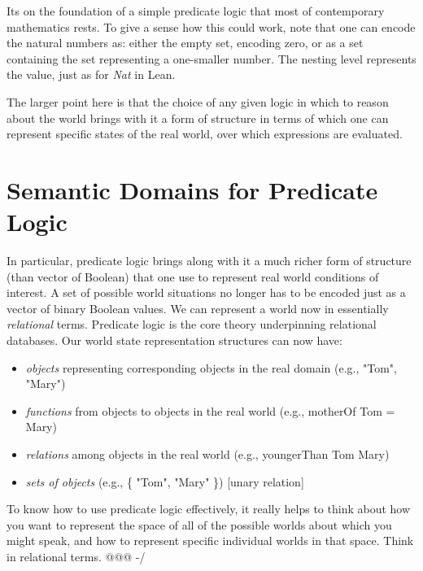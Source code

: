 \documentclass{book}
\providecommand{\tightlist}{%
  \setlength{\itemsep}{0pt}\setlength{\parskip}{0pt}}
\begin{document}
It\textquotesingle s on the foundation of a simple predicate logic that
most of contemporary mathematics rests. To give a sense
how this could work, note that one can encode the natural
numbers as: either the empty set, encoding zero, or as a
set containing the set representing a one-smaller number.
The nesting level represents the value, just as for \emph{Nat} in Lean.

The larger point here is that the choice of any given
logic in which to reason about the world brings with it
a form of structure in terms of which one can represent
specific states of the real world, over which expressions are evaluated.

\hypertarget{pandoc.profile.debug__pandoc__debug__src__predlogic.md__semantic-domains-for-predicate-logic}{%
\section*{Semantic Domains for Predicate Logic}\label{pandoc.profile.debug__pandoc__debug__src__predlogic.md__semantic-domains-for-predicate-logic}}

In particular, predicate logic brings along with it a much
richer form of structure (than vector of Boolean) that one
use to represent real world conditions of interest. A set
of possible world situations no longer has to be encoded
just as a vector of binary Boolean values. We can represent
a world now in essentially \emph{relational} terms. Predicate
logic is the core theory underpinning relational databases.
Our world state representation structures can now have:

\begin{itemize}
\tightlist
\item
  \emph{objects} representing corresponding objects in the real domain (e.g., "Tom", "Mary")
\item
  \emph{functions} from objects to objects  in the real world (e.g., motherOf Tom = Mary)
\item
  \emph{relations} among objects in the real world (e.g., youngerThan Tom Mary)
\item
  \emph{sets of objects} (e.g., \{ "Tom", "Mary" \}) {[}unary relation{]}
\end{itemize}

To know how to use predicate logic effectively, it really
helps to think about how you want to represent the space of
all of the possible worlds about which you might speak, and
how to represent specific individual worlds in that space.
Think in relational terms. @@@ -/
\end{document}
